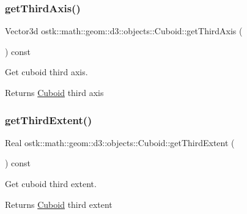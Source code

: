 \subsubsection{\texorpdfstring{get\+Third\+Axis()}{getThirdAxis()}}
{\footnotesize\ttfamily Vector3d ostk\+::math\+::geom\+::d3\+::objects\+::\+Cuboid\+::get\+Third\+Axis (\begin{DoxyParamCaption}{ }\end{DoxyParamCaption}) const}



Get cuboid third axis. 

\begin{DoxyReturn}{Returns}
\hyperlink{classostk_1_1math_1_1geom_1_1d3_1_1objects_1_1_cuboid}{Cuboid} third axis 
\end{DoxyReturn}
\mbox{\label{classostk_1_1math_1_1geom_1_1d3_1_1objects_1_1_cuboid_a8cc3b3e20f67bfd7de8230fb2c471a70}} 
\subsubsection{\texorpdfstring{get\+Third\+Extent()}{getThirdExtent()}}
{\footnotesize\ttfamily Real ostk\+::math\+::geom\+::d3\+::objects\+::\+Cuboid\+::get\+Third\+Extent (\begin{DoxyParamCaption}{ }\end{DoxyParamCaption}) const}



Get cuboid third extent. 

\begin{DoxyReturn}{Returns}
\hyperlink{classostk_1_1math_1_1geom_1_1d3_1_1objects_1_1_cuboid}{Cuboid} third extent 
\end{DoxyReturn}
\mbox{\label{classostk_1_1math_1_1geom_1_1d3_1_1objects_1_1_cuboid_a46a7d78b2dcc261c2dbbf734d0837813}} 
